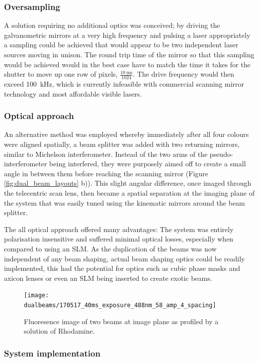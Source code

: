 \subsubsection{Oversampling}
A solution requiring no additional optics was conceived; by driving the galvanometric mirrors at a very high frequency and pulsing a laser appropriately a sampling could be achieved that would appear to be two independent laser sources moving in unison.
The round trip time of the mirror so that this sampling would be achieved would in the best case have to match the time it takes for the shutter to move up one row of pixels, $\frac{\SI{10}{\milli\second}}{1024}$.
The drive frequency would then exceed \SI{100}{\kilo\hertz}, which is currently infeasible with commercial scanning mirror technology and most affordable visible lasers.

\subsubsection{Optical approach}
An alternative method was employed whereby immediately after all four colours were aligned spatially, a beam splitter was added with two returning mirrors, similar to Michelson interferometer.
Instead of the two arms of the pseudo-interferometer being interfered, they were purposely aimed off to create a small angle in between them before reaching the scanning mirror (Figure \ref{fig:dual_beam_layouts} b)).
This slight angular difference, once imaged through the telecentric scan lens, then became a spatial separation at the imaging plane of the system that was easily tuned using the kinematic mirrors around the beam splitter.

The all optical approach offered many advantages: The system was entirely polarisation insensitive and suffered minimal optical losses, especially when compared to using an SLM.
As the duplication of the beams was now independent of any beam shaping, actual beam shaping optics could be readily implemented, this had the potential for optics such as cubic phase masks and axicon lenses or even an SLM being inserted to create exotic beams.

\begin{figure}
  \centering
  \texttt{[image: dualbeams/170517\_40ms\_exposure\_488nm\_58\_amp\_4\_spacing]}
  \caption{Fluoresence image of two beams at image plane as profiled by a solution of Rhodamine.}
  \label{}
\end{figure}

\subsubsection{System implementation}

